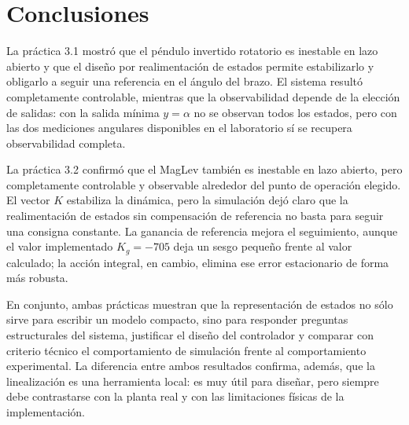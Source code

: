 \documentclass[conference]{IEEEtran}
\begin{document}
\section{Conclusiones}
La pr\'actica 3.1 mostr\'o que el p\'endulo invertido rotatorio es inestable en lazo abierto y que el dise\~no por realimentaci\'on de estados permite estabilizarlo y obligarlo a seguir una referencia en el \'angulo del brazo. El sistema result\'o completamente controlable, mientras que la observabilidad depende de la elecci\'on de salidas: con la salida m\'inima $y=\alpha$ no se observan todos los estados, pero con las dos mediciones angulares disponibles en el laboratorio s\'i se recupera observabilidad completa.

La pr\'actica 3.2 confirm\'o que el MagLev tambi\'en es inestable en lazo abierto, pero completamente controlable y observable alrededor del punto de operaci\'on elegido. El vector $K$ estabiliza la din\'amica, pero la simulaci\'on dej\'o claro que la realimentaci\'on de estados sin compensaci\'on de referencia no basta para seguir una consigna constante. La ganancia de referencia mejora el seguimiento, aunque el valor implementado $K_g=-705$ deja un sesgo peque\~no frente al valor calculado; la acci\'on integral, en cambio, elimina ese error estacionario de forma m\'as robusta.

En conjunto, ambas pr\'acticas muestran que la representaci\'on de estados no s\'olo sirve para escribir un modelo compacto, sino para responder preguntas estructurales del sistema, justificar el dise\~no del controlador y comparar con criterio t\'ecnico el comportamiento de simulaci\'on frente al comportamiento experimental. La diferencia entre ambos resultados confirma, adem\'as, que la linealizaci\'on es una herramienta local: es muy \'util para dise\~nar, pero siempre debe contrastarse con la planta real y con las limitaciones f\'isicas de la implementaci\'on.
\end{document}
